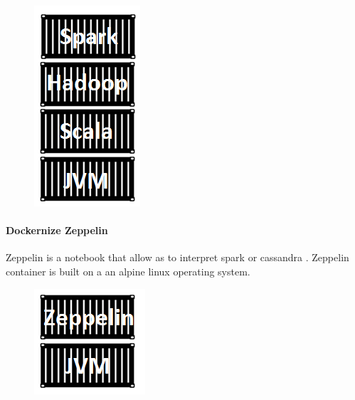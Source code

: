 \begin{figure}[h!]
	\centering
	\includegraphics[height=0.2\textheight]{fig01/SparkFinalContainer}
	\label{fig:FilialesEtClients}
\end{figure}
\paragraph{Dockernize Zeppelin}
Zeppelin is a notebook that allow as to interpret spark or cassandra . Zeppelin container is built on a 
an alpine linux operating system.
\label{sec:sec01}
\begin{figure}[h!]
	\centering
	\includegraphics[height=0.2\textheight]{fig01/ZeppelinContainer}
	\label{fig:FilialesEtClients}
\end{figure}
